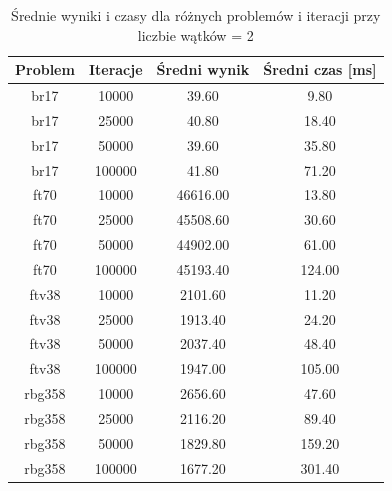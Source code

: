 \begin{table}[h]
\centering
\begin{tabular}{|c|c|c|c|}
\hline
\textbf{Problem} & \textbf{Iteracje} & \textbf{Średni wynik} & \textbf{Średni czas [ms]} \\
\hline
br17 & 10000 & 39.60 & 9.80 \\
br17 & 25000 & 40.80 & 18.40 \\
br17 & 50000 & 39.60 & 35.80 \\
br17 & 100000 & 41.80 & 71.20 \\
\hline
ft70 & 10000 & 46616.00 & 13.80 \\
ft70 & 25000 & 45508.60 & 30.60 \\
ft70 & 50000 & 44902.00 & 61.00 \\
ft70 & 100000 & 45193.40 & 124.00 \\
\hline
ftv38 & 10000 & 2101.60 & 11.20 \\
ftv38 & 25000 & 1913.40 & 24.20 \\
ftv38 & 50000 & 2037.40 & 48.40 \\
ftv38 & 100000 & 1947.00 & 105.00 \\
\hline
rbg358 & 10000 & 2656.60 & 47.60 \\
rbg358 & 25000 & 2116.20 & 89.40 \\
rbg358 & 50000 & 1829.80 & 159.20 \\
rbg358 & 100000 & 1677.20 & 301.40 \\
\hline
\end{tabular}
\caption{Średnie wyniki i czasy dla różnych problemów i iteracji przy liczbie wątków = 2}
\label{tab:srednie_wyniki_{threads}}
\end{table}
